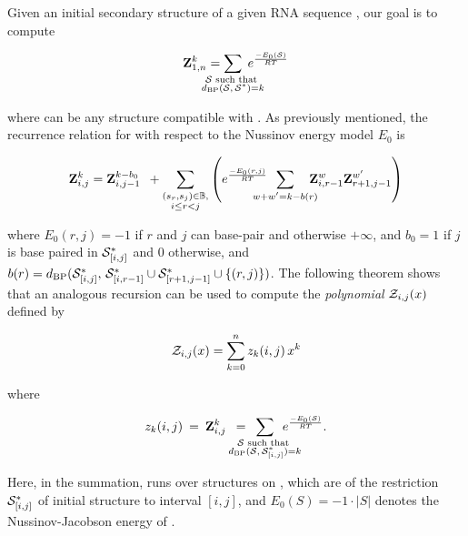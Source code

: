 Given an initial secondary structure \strSt of a
given RNA sequence \seq, our goal is to compute

\begin{align}
\label{eq:fftbor:defZofK}
\bfZ{k}{1,n} = \sum_{\mathclap{\substack{\str \text{ such that }\\ \dBP{\str}{\strSt}=k}}}\;
\boltzNuss{\str}
\end{align}

where \str can be any structure compatible with \seq.
As previously mentioned, the recurrence relation for \rnabor
with respect to the Nussinov energy model $E_0$ is

\begin{align}
\label{eq:fftbor:rnaborNuss}
\bfZ{k}{i,j} = \bfZ{k-b_0}{i,j-1}\enspace +
\sum_{\substack{(s_r,s_j) \in \bpSet, \\ i \le r<j}}
\left(
\boltzNuss{r,j}\enspace \sum_{\mathclap{w+w'=k-b(r)}}\quad
\bfZ{w}{i,r-1} \bfZ{w'}{r+1,j-1}
\right)
\end{align}

where $E_0(r,j)=-1$ if $r$ and $j$ can base-pair and otherwise
$+\infty$, and
$b_0 = 1$ if $j$ is base paired in $\mathcal S^*_{[i,j]}$ and 0 otherwise, and
$b(r)=d_{\text{BP}}(\mathcal S^*_{[i,j]},\,\mathcal S^*_{[i,r-1]} \cup \mathcal S^*_{[r+1,j-1]} \cup\{(r,j)\})$.
The following theorem shows that an analogous recursion can be used to compute
the {\em polynomial} ${\mathcal Z}_{i,j}(x)$ defined by

\begin{align}
\label{eq:fftbor:polynomialZij}
\emZ{i,j} = \sum_{k=0}^n z_k(i,j)\,x^k
\end{align}

where

\begin{align}
z_k(i,j)\>=\>
\bfZ{k}{i,j}\enspace=\enspace
\sum_{\mathclap{\substack{\str \text{ such that } \\
\dBP{\str}{\strSt_{[i,j]}}=k}}}\enspace
\boltzNuss{\str}.
\end{align}

Here, in the summation, \str runs over structures on \seqIJ, which
are \kNbrs of the restriction $\mathcal S^*_{[i,j]}$ of initial structure
\strSt to interval $[i,j]$, and
$E_0(S)=-1 \cdot |S|$ denotes the Nussinov-Jacobson energy of \str.

